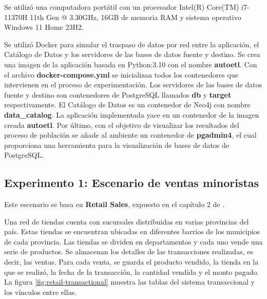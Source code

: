Se utilizó una computadora portátil con un procesador Intel(R) Core(TM) i7-11370H 11th Gen @ 3.30GHz, 16GB de 
memoria RAM y sistema operativo Windows 11 Home 23H2.

Se utilizó Docker para simular el traspaso de datos por red entre la aplicación, el Catálogo de Datos y 
los servidores de las bases de datos fuente y destino. Se crea una imagen de la aplicación basada en Python:3.10 con el 
nombre \textbf{autoetl}. 
Con el archivo \textbf{docker-compose.yml} se inicializan todos los contenedores que intervienen en el proceso 
de experimentación. Los servidores de las bases de datos fuente y destino son contenedores de PostgreSQL llamados 
\textbf{db} y \textbf{target} respectivamente. El Catálogo de Datos es un contenedor de Neo4j con nombre 
\textbf{data\_catalog}. La aplicación implementada yace en un contenedor de la imagen creada \textbf{autoetl}. 
Por \'ultimo, con el objetivo de visualizar los resultados del proceso de población se añade al ambiente un 
contenedor de \textbf{pgadmin4}, el cual proporciona una herramienta para la visualización de bases de datos 
de PostgreSQL.

\subsection{Experimento 1: Escenario de ventas minoristas}

Este escenario se basa en \textbf{Retail Sales}, expuesto en el capítulo 2
de \cite{kimball2011data}. 

Una red de tiendas cuenta con sucursales distribuidas en varias provincias del país. Estas tiendas se encuentran ubicadas 
en diferentes barrios de los municipios de cada provincia. Las tiendas se dividen en departamentos y cada uno vende 
una serie de productos. Se almacenan los detalles de las transacciones realizadas, es decir, las ventas. Para cada venta, se guarda 
el producto vendido, la tienda en la que se realizó, la fecha de la transacción, la cantidad vendida y el monto pagado.
La figura \ref{fig:retail-transactional} muestra las tablas del sistema transaccional y los vínculos entre ellas.

